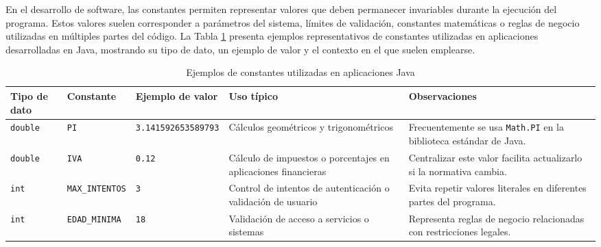 \documentclass[12pt,twoside]{book}
\begin{document}
						En el desarrollo de software, las constantes permiten representar valores que deben permanecer invariables durante la ejecución del programa. Estos valores suelen corresponder a parámetros del sistema, límites de validación, constantes matemáticas o reglas de negocio utilizadas en múltiples partes del código. La Tabla \ref{tab:constantes_java} presenta ejemplos representativos de constantes utilizadas en aplicaciones desarrolladas en Java, mostrando su tipo de dato, un ejemplo de valor y el contexto en el que suelen emplearse.
						
						\begin{table}[H]
							\centering
							\caption{Ejemplos de constantes utilizadas en aplicaciones Java}
							\label{tab:constantes_java}
							\footnotesize
							
							\begin{tabularx}{\textwidth}{
									>{\raggedright\arraybackslash}X
									>{\raggedright\arraybackslash}X
									>{\raggedright\arraybackslash}X
									>{\raggedright\arraybackslash}X
									>{\raggedright\arraybackslash}X}
								
								\toprule
								\textbf{Tipo de dato} &
								\textbf{Constante} &
								\textbf{Ejemplo de valor} &
								\textbf{Uso típico} &
								\textbf{Observaciones} \\
								
								\midrule
								
								\texttt{double} &
								\texttt{PI} &
								\texttt{3.141592653589793} &
								Cálculos geométricos y trigonométricos &
								Frecuentemente se usa \texttt{Math.PI} en la biblioteca estándar de Java. \\
								
								\texttt{double} &
								\texttt{IVA} &
								\texttt{0.12} &
								Cálculo de impuestos o porcentajes en aplicaciones financieras &
								Centralizar este valor facilita actualizarlo si la normativa cambia. \\
								
								\texttt{int} &
								\texttt{MAX\_INTENTOS} &
								\texttt{3} &
								Control de intentos de autenticación o validación de usuario &
								Evita repetir valores literales en diferentes partes del programa. \\
								
								\texttt{int} &
								\texttt{EDAD\_MINIMA} &
								\texttt{18} &
								Validación de acceso a servicios o sistemas &
								Representa reglas de negocio relacionadas con restricciones legales. \\
								

\end{tabularx}
\end{table}
\end{document}
